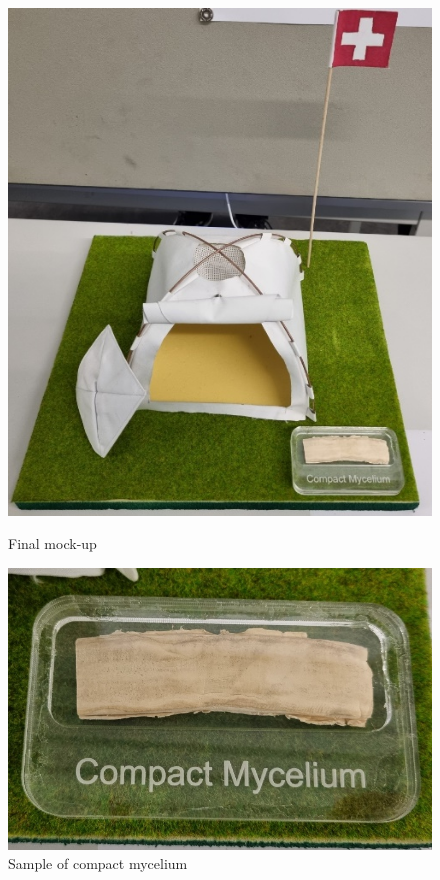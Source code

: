 \documentclass{article}
\begin{document}
\begin{figure}[ht!]
    \centering
    \begin{minipage}{0.45\textwidth}
        \centering
        \includegraphics[width=.8\textwidth]{media/final_mockup.png}
        \caption{Final mock-up}
        \label{fig:final_mockup}
    \end{minipage}%
    \hfill
    \begin{minipage}{0.45\textwidth}
        \centering
        \includegraphics[width=\textwidth]{media/compact_myc.png}
        \caption{Sample of compact mycelium}
        \label{fig:compact_myc}
    \end{minipage}
\end{figure}
\end{document}

